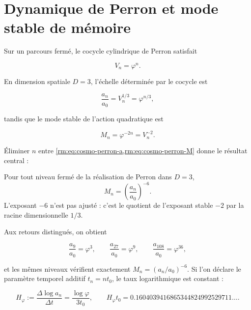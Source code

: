 \section{Dynamique de Perron et mode stable de mémoire}

Sur un parcours fermé, le cocycle cylindrique de Perron satisfait

\begin{equation}
V_n=\varphi^n.
\label{rm:eq:cosmo-perron-V}
\end{equation}

En dimension spatiale \(D=3\), l’échelle déterminée par le cocycle est

\begin{equation}
\frac{a_n}{a_0}=V_n^{1/3}=\varphi^{n/3},
\label{rm:eq:cosmo-perron-a}
\end{equation}

tandis que le mode stable de l’action quadratique est

\begin{equation}
M_n=\varphi^{-2n}=V_n^{-2}.
\label{rm:eq:cosmo-perron-M}
\end{equation}

Éliminer \(n\) entre \cref{rm:eq:cosmo-perron-a,rm:eq:cosmo-perron-M} donne le résultat central :

\begin{theorem}
Pour tout niveau fermé de la réalisation de Perron dans \(D=3\),
\begin{equation}
\boxed{
M_n=\left(\frac{a_n}{a_0}\right)^{-6}.}
\label{rm:eq:cosmo-minus-six}
\end{equation}
L’exposant \(-6\) n’est pas ajusté : c’est le quotient de l’exposant stable \(-2\) par la racine dimensionnelle \(1/3\).
\end{theorem}

Aux retours distingués, on obtient

\[
\frac{a_9}{a_0}=\varphi^3,
\qquad
\frac{a_{27}}{a_0}=\varphi^9,
\qquad
\frac{a_{108}}{a_0}=\varphi^{36},
\]

et les mêmes niveaux vérifient exactement \(M_n=(a_n/a_0)^{-6}\). Si l’on déclare le paramètre temporel additif \(t_n=nt_0\), le taux logarithmique est constant :

\begin{equation}
H_\varphi
:=\frac{\Delta\log a_n}{\Delta t}
=\frac{\log\varphi}{3t_0},
\qquad
H_\varphi t_0
=0.1604039416865344824992529711\ldots.
\label{rm:eq:cosmo-Hphi}
\end{equation}

